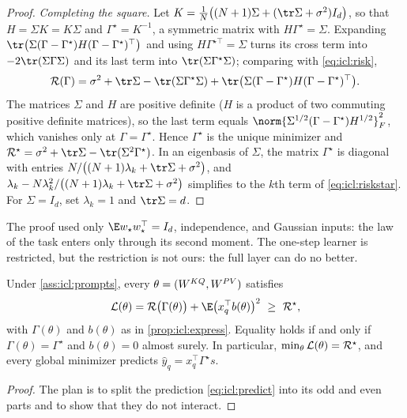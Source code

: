 \begin{refsection}
\begin{proof}
\emph{Completing the square.} Let $K=\frac1N\bigl((N+1)\Sigma+(\tr\Sigma+\sigma^2)I_d\bigr)$, so that $H=\Sigma K=K\Sigma$ and $\Gamma^\star=K^{-1}$, a symmetric matrix with $H\Gamma^\star=\Sigma$. Expanding $\tr\bigl(\Sigma(\Gamma-\Gamma^\star)H(\Gamma-\Gamma^\star)^\top\bigr)$ and using $H\Gamma^{\star\top}=\Sigma$ turns its cross term into $-2\tr(\Sigma\Gamma\Sigma)$ and its last term into $\tr(\Sigma\Gamma^\star\Sigma)$; comparing with \eqref{eq:icl:risk},
\[
  \cR(\Gamma)=\sigma^2+\tr\Sigma-\tr(\Sigma\Gamma^\star\Sigma)+\tr\bigl(\Sigma(\Gamma-\Gamma^\star)H(\Gamma-\Gamma^\star)^\top\bigr).
\]
The matrices $\Sigma$ and $H$ are positive definite ($H$ is a product of two commuting positive definite matrices), so the last term equals $\norm{\Sigma^{1/2}(\Gamma-\Gamma^\star)H^{1/2}}_F^2$, which vanishes only at $\Gamma=\Gamma^\star$. Hence $\Gamma^\star$ is the unique minimizer and $\cR^\star=\sigma^2+\tr\Sigma-\tr(\Sigma^2\Gamma^\star)$. In an eigenbasis of $\Sigma$, the matrix $\Gamma^\star$ is diagonal with entries $N/\bigl((N+1)\lambda_k+\tr\Sigma+\sigma^2\bigr)$, and $\lambda_k-N\lambda_k^2/\bigl((N+1)\lambda_k+\tr\Sigma+\sigma^2\bigr)$ simplifies to the $k$th term of \eqref{eq:icl:riskstar}. For $\Sigma=I_d$, set $\lambda_k=1$ and $\tr\Sigma=d$.
\end{proof}

The proof used only $\E w_\star w_\star^\top=I_d$, independence, and Gaussian inputs: the law of the task enters only through its second moment. The one-step learner is restricted, but the restriction is not ours: the full layer can do no better.

\begin{theorem}\label{thm:icl:global}
Under \cref{ass:icl:prompts}, every $\theta=(W^{KQ},W^{PV})$ satisfies
\[
  \Loss(\theta)=\cR\bigl(\Gamma(\theta)\bigr)+\E\bigl(x_q^\top b(\theta)\bigr)^2\ \ge\ \cR^\star ,
\]
with $\Gamma(\theta)$ and $b(\theta)$ as in \cref{prop:icl:express}. Equality holds if and only if $\Gamma(\theta)=\Gamma^\star$ and $b(\theta)=0$ almost surely. In particular, $\min_\theta\mathcal{L}(\theta)=\mathcal{R}^\star$, and every global minimizer predicts $\hat y_q=x_q^\top\Gamma^\star s$.
\end{theorem}

\begin{proof}
The plan is to split the prediction \eqref{eq:icl:predict} into its odd and even parts and to show that they do not interact.


\end{proof}
\end{refsection}
